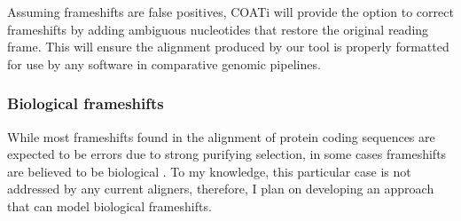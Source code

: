 

Assuming frameshifts are false positives, COATi will provide the option to
correct frameshifts by adding ambiguous nucleotides that restore the original
reading frame.
This will ensure the alignment produced by our tool is properly formatted for
use by any software in comparative genomic pipelines.

\subsubsection{Biological frameshifts}

While most frameshifts found in the alignment of protein coding sequences are
expected to be errors due to strong purifying selection, in some cases
frameshifts are believed to be biological \parencite{hu2012predicting}.
To my knowledge, this particular case is not addressed by any current aligners,
therefore, I plan on developing an approach that can model biological
frameshifts.

